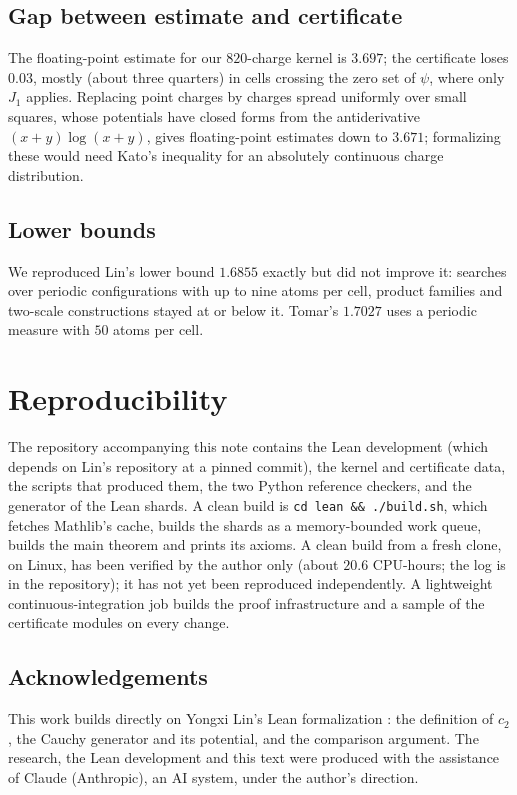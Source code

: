\documentclass[11pt]{amsart}
\theoremstyle{definition}
\theoremstyle{remark}
\begin{document}
\subsection*{Gap between estimate and certificate}
The floating-point estimate for our $820$-charge kernel is $3.697$; the certificate loses $0.03$, mostly
(about three quarters) in cells crossing the zero set of $\psi$, where only $J_1$ applies. Replacing
point charges by charges spread uniformly over small squares, whose potentials have closed forms
from the antiderivative $(x+y)\log(x+y)$, gives floating-point estimates down to $3.671$; formalizing
these would need Kato's inequality for an absolutely continuous charge distribution.

\subsection*{Lower bounds}
We reproduced Lin's lower bound $1.6855$ exactly but did not improve it: searches over periodic
configurations with up to nine atoms per cell, product families and two-scale constructions stayed
at or below it. Tomar's $1.7027$ \cite{Tomar} uses a periodic measure with $50$ atoms per cell.

\section{Reproducibility}

The repository accompanying this note contains the Lean development (which depends on Lin's
repository at a pinned commit), the kernel and certificate data, the scripts that produced them, the
two Python reference checkers, and the generator of the Lean shards. A clean build is
\texttt{cd lean \&\& ./build.sh}, which fetches Mathlib's cache, builds the shards as a
memory-bounded work queue, builds the main theorem and prints its axioms. A clean build from a fresh
clone, on Linux, has been verified by the author only (about $20.6$ CPU-hours; the log is in the
repository); it has not yet been reproduced independently. A lightweight continuous-integration job
builds the proof infrastructure and a sample of the certificate modules on every change.

\subsection*{Acknowledgements}
This work builds directly on Yongxi Lin's Lean formalization \cite{LinRepo}: the definition of
$c_2$, the Cauchy generator and its potential, and the comparison argument. The research,
the Lean development and this text were produced with the assistance of Claude (Anthropic), an AI
system, under the author's direction.
\end{document}
